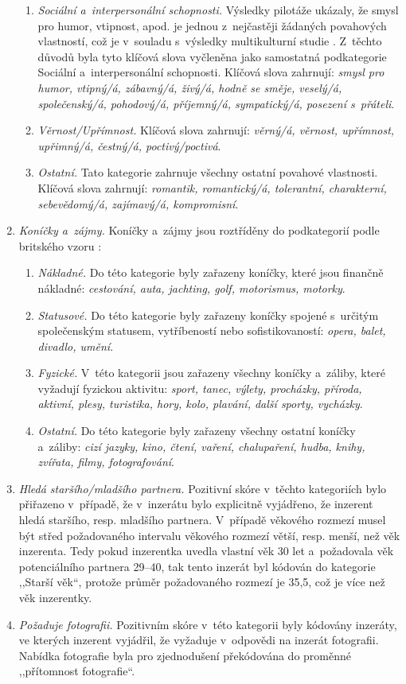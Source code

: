 \documentclass[a4paper, 12pt, notitlepage, oneside, numbers=noenddot]{report}
\begin{document}
\begin{enumerate}
\begin{enumerate}
\item \emph{Sociální a~interpersonální schopnosti.} Výsledky pilotáže
  ukázaly, že smysl pro humor, vtipnost, apod. je jednou z~nejčastěji
  žádaných povahových vlastností, což je v~souladu s~výsledky
  multikulturní studie \citep{BussEtAl1990}.  Z~těchto důvodů byla
  tyto klíčová slova vyčleněna jako samostatná podkategorie Sociální
  a~interpersonální schopnosti. Klíčová slova zahrnují: \emph{smysl
    pro humor, vtipný/á, zábavný/á, živý/á, hodně se směje, veselý/á,
    společenský/á, pohodový/á, pří\-jemný/á, sympatický/á, posezení
    s~přáteli}.
\item \emph{Věrnost/Upřímnost.}  Klíčová slova zahrnují: \emph{věrný/á, věrnost,
  upřímnost, upřimný/á, čestný/á, poctivý/poctivá}.
\item \emph{Ostatní.} Tato kategorie zahrnuje všechny ostatní povahové
  vlastnosti. Klíčová slova zahrnují: \emph{romantik, romantický/á,
  tolerantní, charakterní, sebevědomý/á, zajímavý/á, kompromisní}.
\end{enumerate}
\item \emph{Koníčky a~zájmy.} Koníčky a~zájmy jsou roztříděny do podkategorií
  podle britského vzoru \citep{GreenlessMcGrew1994}:

\begin{enumerate}
\item \emph{Nákladné.} Do této kategorie byly zařazeny koníčky, které jsou
  finančně nákladné: \emph{cestování, auta, jachting, golf,
    motorismus, motorky}.
\item \emph{Statusové.} Do této kategorie byly zařazeny koníčky spojené
  s~určitým spole\-čen\-ským statusem, vytříbeností nebo sofistikovaností:
  \emph{opera, balet, divadlo, umění}.
\item \emph{Fyzické.} V~této kategorii jsou zařazeny všechny koníčky
  a~záliby, které vyžadují fyzickou aktivitu: \emph{sport, tanec,
    výlety, procházky, příroda, aktivní, plesy, turistika, hory, kolo,
    plavání, další sporty, vycházky}.
\item \emph{Ostatní.} Do této kategorie byly zařazeny všechny ostatní koníčky
  a~záliby: \emph{cizí jazyky, kino, čtení, vaření, chalupaření,
    hudba, knihy, zvířata, filmy, fotografování}.
\end{enumerate}
\item \emph{Hledá staršího/mladšího partnera.}  Pozitivní skóre v~těchto
  kategoriích bylo přiřazeno v~případě, že v~inzerátu bylo explicitně
  vyjádřeno, že inzerent hledá staršího, resp. mladšího partnera.
  V~případě věkového rozmezí musel být střed požadovaného intervalu
  věkového rozmezí větší, resp. menší, než věk inzerenta.  Tedy pokud
  inzerentka uvedla vlastní věk 30 let a~požadovala věk
  potenciálního partnera 29--40, tak tento inzerát byl kódován do
  kategorie ,,Starší věk``, protože průměr požadovaného rozmezí je
  35,5, což je více než věk inzerentky.
\item \emph{Požaduje fotografii.} Pozitivním skóre v~této kategorii byly
  kódovány inzeráty, ve kterých inzerent vyjádřil, že vyžaduje
  v~odpovědi na inzerát fotografii.  Nabídka fotografie byla pro
  zjednodušení překódována do proměnné ,,přítomnost fotografie``.
\end{enumerate}
\end{document}
